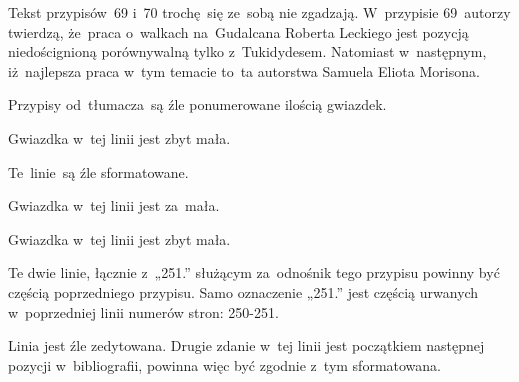 \documentclass[a4paper,11pt]{article}
\begin{document}
\start {} Tekst przypisów~69 i~70 trochę~się ze~sobą nie
zgadzają. W~przypisie 69~autorzy twierdzą, że~praca o~walkach
na~Gudalcana Roberta Leckiego jest pozycją niedoścignioną porównywalną
tylko z~Tukidydesem. Natomiast w~następnym, iż~najlepsza praca w~tym
temacie to~ta autorstwa Samuela Eliota Morisona.

\vspace{\spaceFour}



\start {} Przypisy od~tłumacza~są źle ponumerowane ilością
gwiazdek.

\vspace{\spaceFour}



\start {} Gwiazdka w~tej linii jest zbyt mała.

\vspace{\spaceFour}



\start {} Te~linie~są źle sformatowane.

\vspace{\spaceFour}



\start {} Gwiazdka w~tej linii jest za~mała.

\vspace{\spaceFour}



\start {} Gwiazdka w~tej linii jest zbyt mała.

\vspace{\spaceFour}



\start {} Te dwie linie, łącznie z~„251.” służącym
za~odnośnik tego przypisu powinny być częścią poprzedniego przypisu.
Samo oznaczenie „251.” jest częścią urwanych w~poprzedniej linii
numerów stron: 250-251.

\vspace{\spaceFour}



\start {} Linia jest źle zedytowana. Drugie zdanie w~tej
linii jest początkiem następnej pozycji w~bibliografii, powinna więc
być zgodnie z~tym sformatowana.

\vspace{\spaceFour}





\newpage
\end{document}
